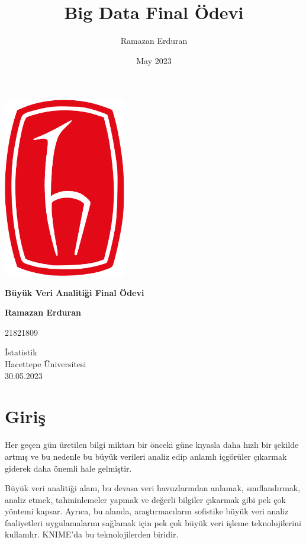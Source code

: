 \documentclass{article}
\title{Big Data Final Ödevi}
\author{Ramazan Erduran}
\date{May 2023}
\begin{document}
\begin{titlepage}
    \begin{center}
        \centering
        \includegraphics[width=0.4\textwidth]{Images/hacettepe_logo.png}
        
        \vspace*{1cm}
        \Huge
        \textbf{Büyük Veri Analitiği Final Ödevi}
        
        \vspace{2.5cm}
        
        \textbf{Ramazan Erduran}

        \Large
        21821809
        
        \vfill
        
        \Large
        İstatistik \\
        Hacettepe Üniversitesi \\
        30.05.2023
        
    \end{center}
\end{titlepage}

\clearpage
\tableofcontents

\clearpage
\section{Giriş}
Her geçen gün üretilen bilgi miktarı bir önceki güne kıyasla daha hızlı bir şekilde artmış ve bu nedenle bu büyük verileri analiz edip anlamlı içgörüler çıkarmak giderek daha önemli hale gelmiştir.

\vspace{5pt}
Büyük veri analitiği alanı, bu devasa veri havuzlarından anlamak, sınıflandırmak, analiz etmek, tahminlemeler yapmak ve değerli bilgiler çıkarmak gibi pek çok yöntemi kapsar. Ayrıca, bu alanda, araştırmacıların sofistike büyük veri analiz faaliyetleri uygulamalarını sağlamak için pek çok büyük veri işleme teknolojilerini kullanılır. KNIME'da bu teknolojilerden biridir.
\end{document}
